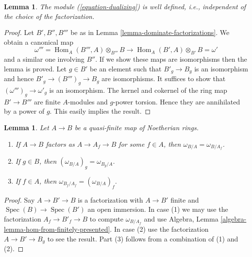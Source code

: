 \documentclass{stacks-project}
\theoremstyle{plain}
\newtheorem{lemma}[subsection]{Lemma}
\theoremstyle{definition}
\theoremstyle{remark}
\numberwithin{equation}{subsection}
\def\Spec{\mathop{\mathrm{Spec}}}
\def\Hom{\mathop{\mathrm{Hom}}\nolimits}
\begin{document}
\begin{lemma}
\label{lemma-dualizing-well-defined}
The module (\ref{equation-dualizing}) is well defined, i.e.,
independent of the choice of the factorization.
\end{lemma}

\begin{proof}
Let $B', B'', B'''$ be as in Lemma \ref{lemma-dominate-factorizations}.
We obtain a canonical map
$$
\omega''' = \Hom_A(B''', A) \otimes_{B'''} B \longrightarrow
\Hom_A(B', A) \otimes_{B'} B = \omega'
$$
and a similar one involving $B''$. If we show these maps are isomorphisms
then the lemma is proved. Let $g \in B'$ be an element such that
$B'_g \to B_g$ is an isomorphism and hence $B'_g \to (B''')_g \to B_g$
are isomorphisms. It suffices to show that $(\omega''')_g \to \omega'_g$
is an isomorphism. The kernel and cokernel of the ring map $B' \to B'''$
are finite $A$-modules and $g$-power torsion.
Hence they are annihilated by a power of $g$.
This easily implies the result.
\end{proof}

\begin{lemma}
\label{lemma-localize-dualizing}
Let $A \to B$ be a quasi-finite map of Noetherian rings.
\begin{enumerate}
\item If $A \to B$ factors as $A \to A_f \to B$ for some $f \in A$,
then $\omega_{B/A} = \omega_{B/A_f}$.
\item If $g \in B$, then $(\omega_{B/A})_g = \omega_{B_g/A}$.
\item If $f \in A$, then $\omega_{B_f/A_f} = (\omega_{B/A})_f$.
\end{enumerate}
\end{lemma}

\begin{proof}
Say $A \to B' \to B$ is a factorization with $A \to B'$ finite and
$\Spec(B) \to \Spec(B')$ an open immersion. In case (1) we may use
the factorization $A_f \to B'_f \to B$ to compute $\omega_{B/A_f}$
and use Algebra, Lemma \ref{algebra-lemma-hom-from-finitely-presented}.
In case (2) use the factorization $A \to B' \to B_g$ to see the result.
Part (3) follows from a combination of (1) and (2).
\end{proof}
\end{document}

